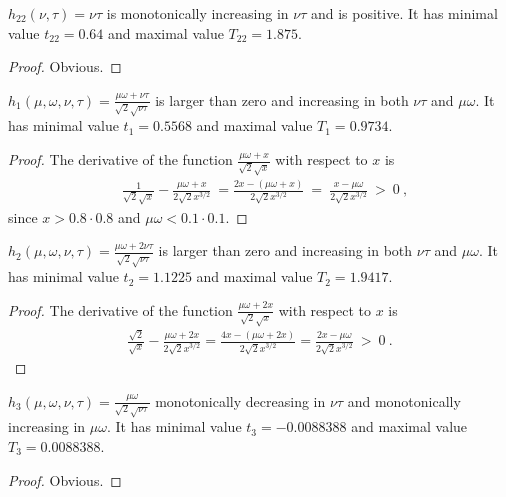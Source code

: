 \documentclass{article}
\begin{document}
\begin{lemma}
\label{lem:x22}

$h_{22}(\nu, \tau)=\nu \tau$ is
monotonically increasing in $\nu \tau$ and is positive.
It has minimal value $t_{22}=0.64$ and maximal value
$T_{22}=1.875$.
\end{lemma}
\begin{proof}
Obvious. 
\end{proof}


\begin{lemma}
\label{lem:xx1}

$h_1(\mu, \omega,\nu, \tau)=\frac{\mu \omega+\nu \tau}{\sqrt{2} \sqrt{\nu \tau}}$
is larger than zero and increasing in both $\nu
\tau$ and $\mu \omega$.
It has minimal value $t_1=0.5568$ and maximal value
$T_1=0.9734$.
\end{lemma}
\begin{proof}
The derivative of the function
$\frac{\mu \omega+x}{\sqrt{2} \sqrt{x}}$
with respect to $x$ is
\begin{align}
&\frac{1}{\sqrt{2} \sqrt{x}}-\frac{\mu \omega+x}{2 \sqrt{2} x^{3/2}}
\ = \frac{2 x-(\mu \omega+x)}{2 \sqrt{2} x^{3/2}}
\ = \ \frac{x-\mu \omega}{2 \sqrt{2} x^{3/2}} \ > \ 0 \ ,
\end{align}
since $x>0.8 \cdot 0.8$ and $\mu \omega<0.1 \cdot 0.1$.
\end{proof}

\begin{lemma}
\label{lem:xx2}

$h_2(\mu, \omega,\nu, \tau)=\frac{\mu \omega+2 \nu \tau}{\sqrt{2} \sqrt{\nu \tau}}$
is larger than zero and increasing in both $\nu
\tau$ and $\mu \omega$.
It has minimal value $t_2=1.1225$ and maximal value
$T_2=1.9417$.
\end{lemma}
\begin{proof}
The derivative of the function
$\frac{\mu \omega+2 x}{\sqrt{2} \sqrt{x}}$
with respect to $x$ is
\begin{align}
\frac{\sqrt{2}}{\sqrt{x}}-\frac{\mu \omega+2 x}{2 \sqrt{2} x^{3/2}}=\frac{4 x-(\mu \omega+2 x)}{2 \sqrt{2} x^{3/2}}=
\frac{2 x-\mu \omega}{2 \sqrt{2} x^{3/2}} \ > \ 0 \ .
\end{align}
\end{proof}

\begin{lemma}
\label{lem:xx3}

$h_3(\mu, \omega,\nu, \tau)=\frac{\mu \omega}{\sqrt{2} \sqrt{\nu \tau}}$
monotonically decreasing in $\nu
\tau$ and monotonically increasing in $\mu \omega$.
It has minimal value $t_3=-0.0088388$ and maximal value
$T_3=0.0088388$.
\end{lemma}
\begin{proof}
Obvious.
\end{proof}
\end{document}
